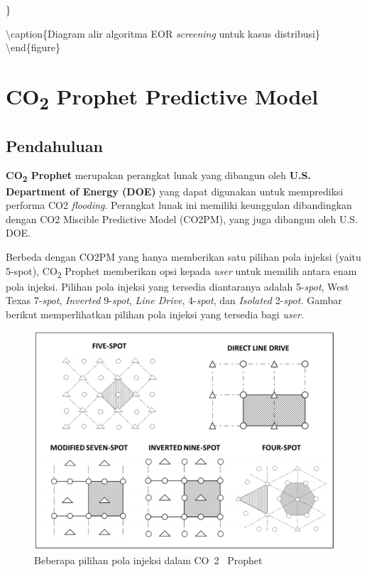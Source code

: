 \documentclass[
]{book}
\begin{document}
\}

\textbackslash caption\{Diagram alir algoritma EOR \emph{screening} untuk kasus distribusi\}\label{fig:unnamed-chunk-39}
\textbackslash end\{figure\}

\hypertarget{co2-prophet-predictive-model}{%
\chapter{\texorpdfstring{CO\textsubscript{2} Prophet Predictive Model}{CO2 Prophet Predictive Model}}\label{co2-prophet-predictive-model}}

\hypertarget{pendahuluan}{%
\section{Pendahuluan}\label{pendahuluan}}

\textbf{CO\textsubscript{2} Prophet} merupakan perangkat lunak yang dibangun oleh \textbf{U.S. Department of Energy (DOE)} yang dapat digunakan untuk memprediksi performa CO2 \emph{flooding}. Perangkat lunak ini memiliki keunggulan dibandingkan dengan CO2 Miscible Predictive Model (CO2PM), yang juga dibangun oleh U.S. DOE.

Berbeda dengan CO2PM yang hanya memberikan satu pilihan pola injeksi (yaitu 5-spot), CO\textsubscript{2} Prophet memberikan opsi kepada \emph{user} untuk memilih antara enam pola injeksi. Pilihan pola injeksi yang tersedia diantaranya adalah 5-\emph{spot}, West Texas 7-\emph{spot}, \emph{Inverted} 9-\emph{spot}, \emph{Line Drive}, 4-\emph{spot}, dan \emph{Isolated} 2-\emph{spot.} Gambar berikut memperlihatkan pilihan pola injeksi yang tersedia bagi \emph{user}.

\begin{figure}

{\centering \includegraphics[width=0.5\linewidth]{images/co2prophet/patternCO2} 

}

\caption{Beberapa pilihan pola injeksi dalam CO~2~ Prophet}\label{fig:unnamed-chunk-41}
\end{figure}
\end{document}
